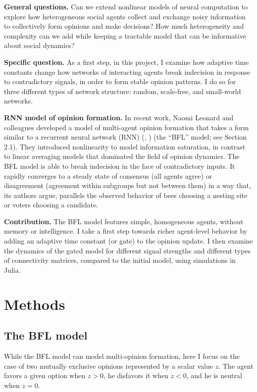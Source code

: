 \documentclass[]{article}
\begin{document}
\textbf{General questions.} Can we extend nonlinear models of neural computation to explore how heterogeneous social agents collect and exchange noisy information to collectively form opinions and make decisions? How much heterogeneity and complexity can we add while keeping a tractable model that can be informative about social dynamics?

\textbf{Specific question.} As a first step, in this project, I examine how adaptive time constants change how networks of interacting agents break indecision in response to contradictory signals, in order to form stable opinion patterns. I do so for three different types of network structure: random, scale-free, and small-world networks.

\textbf{RNN model of opinion formation.} In recent work, Naomi Leonard and colleagues developed a model of multi-agent opinion formation that takes a form similar to a recurrent neural network (RNN) (\cite{bizyaevaNonlinearOpinionDynamics2022}, \cite{leonardFastFlexibleMultiAgent2024}) (the “BFL” model; see Section 2.1). They introduced nonlinearity to model information saturation, in contrast to linear averaging models that dominated the field of opinion dynamics. The BFL model is able to break indecision in the face of contradictory inputs. It rapidly converges to a steady state of consensus (all agents agree) or disagreement (agreement within subgroups but not between them) in a way that, its authors argue, parallels the observed behavior of bees choosing a nesting site or voters choosing a candidate.

\textbf{Contribution.} The BFL model features simple, homogeneous agents, without memory or intelligence. I take a first step towards richer agent-level behavior by adding an adaptive time constant (or gate) to the opinion update. I then examine the dynamics of the gated model for different signal strengths and different types of connectivity matrices, compared to the initial model, using simulations in Julia.

\section{Methods}
\subsection{The BFL model}

While the BFL model can model multi-opinion formation, here I focus on the case of two mutually exclusive opinions represented by a scalar value $z$. The agent favors a given option when $z>0$, he disfavors it when $z<0$, and he is neutral when $z = 0$.
\end{document}
